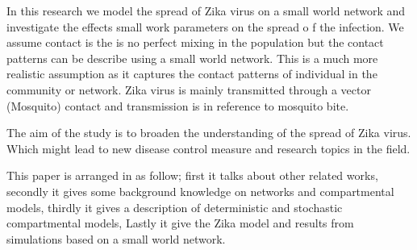 In this research we model the spread of Zika virus on a small world network and investigate the effects small work parameters on the spread o f the infection. We assume contact is the is no perfect mixing in the population but the contact patterns can be describe using a small world network. This is a much more realistic assumption as it captures the contact patterns of individual in the community or network. Zika virus is mainly transmitted through a vector (Mosquito) contact and transmission is in reference to mosquito bite. 

The aim of the study is to broaden the understanding of the spread of Zika virus. Which might lead to new disease control measure and research topics in the field.

This paper is arranged in as follow; first it talks about other related works, secondly it gives some background knowledge on networks and compartmental models, thirdly it gives a description of deterministic and stochastic compartmental models, Lastly it give the Zika model and results from simulations based on a small world network.

